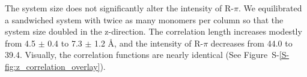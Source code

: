 \documentclass[journal=jpcbfk,manuscript=article]{achemso}
\begin{document}
  The system size does not significantly alter the intensity of R-$\pi$. We equilibrated a 
  sandwiched system with twice as many monomers per column so that the system size doubled in 
  the z-direction. The correlation length increases modestly from 4.5 $\pm$ 0.4 to 7.3 $\pm$ 1.2 \AA, 
  and the intensity of R-$\pi$ decreases from 44.0 to 39.4. Visually, the correlation functions
  are nearly identical (See Figure~S-\ref{S-fig:z_correlation_overlay}). 
  
  
  
\end{document}

